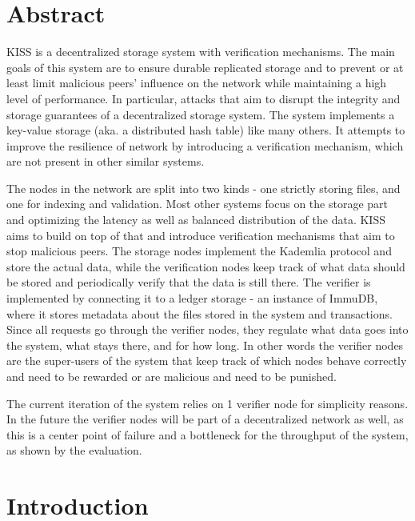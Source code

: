 \documentclass[ twoside,openright,titlepage,numbers=noenddot,headinclude,%
                footinclude=true,cleardoublepage=empty,abstractoff, %
                BCOR=5mm,paper=a4,fontsize=11pt,%
                ngerman,american,%
                ]{scrreprt}
\begin{document}
\raggedbottom
{} %
\pagestyle{plain}

\begingroup

\chapter*{Abstract}
KISS is a decentralized storage system with verification mechanisms.
The main goals of this system are to ensure durable replicated storage and to prevent
or at least limit malicious peers' influence on the network while maintaining a high level of performance.
In particular, attacks that aim to disrupt the integrity and storage guarantees of a decentralized storage system.
The system implements a key-value storage (aka. a distributed hash table) like many others.
It attempts to improve the resilience of network by introducing a verification mechanism,
which are not present in other similar systems.

The nodes in the network are split into two kinds - one strictly storing files,
and one for indexing and validation.
Most other systems focus on the storage part and optimizing the latency as well as balanced distribution
of the data.
KISS aims to build on top of that and introduce verification mechanisms that aim to stop malicious peers.
The storage nodes implement the Kademlia protocol and store the actual data,
while the verification nodes keep track of what data should be stored and periodically
verify that the data is still there.
The verifier is implemented by connecting it to a ledger storage - an instance of ImmuDB,
where it stores metadata about the files stored in the system and transactions.
Since all requests go through the verifier nodes, they regulate what data goes into the system, 
what stays there, and for how long.
In other words the verifier nodes are the super-users of the system that keep track of which
nodes behave correctly and need to be rewarded or are malicious and need to be punished.

The current iteration of the system relies on 1 verifier node for simplicity reasons.
In the future the verifier nodes will be part of a decentralized network as well, 
as this is a center point of failure and a bottleneck for the throughput of the system,
as shown by the evaluation.



\vfill
\endgroup			

\chapter{Introduction}
\end{document}
